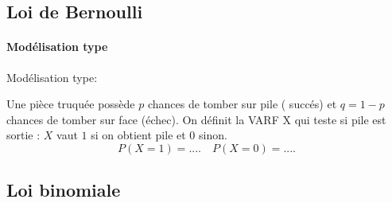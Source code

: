\documentclass[a4paper, 11pt]{article}
\begin{document}
 

\subsection{Loi de Bernoulli}



\paragraph{Mod\'elisation type}

 Mod\'elisation type: 
 
Une pièce truquée possède $p$ chances de tomber sur pile ( succés) et $q=1-p$ chances de tomber sur face (échec). On définit la VARF X qui teste si pile est sortie : $X$ vaut $1$ si on obtient pile et $0$ sinon. 
$$P(X=1) =.... \quad P(X=0) = ....$$






%





%
%










\subsection{Loi binomiale}
\end{document}
